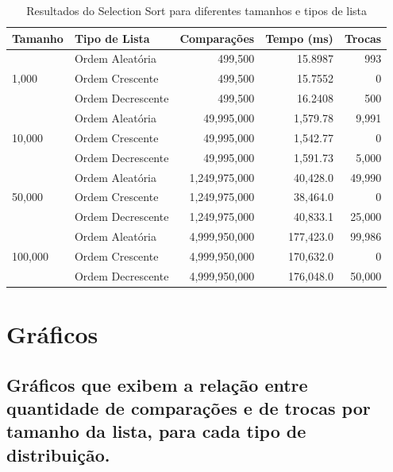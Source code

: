 \documentclass[tcc1,project]{uftex}
\begin{document}
\begin{table}[h]
\centering
\caption{Resultados do Selection Sort para diferentes tamanhos e tipos de lista}
\begin{tabular}{llrrr}
\toprule
\textbf{Tamanho} & \textbf{Tipo de Lista} & \textbf{Comparações} & \textbf{Tempo (ms)} & \textbf{Trocas} \\
\midrule
\multirow{3}{*}{1,000}   & Ordem Aleatória   & 499,500  & 15.8987   & 993 \\
                         & Ordem Crescente   & 499,500  & 15.7552   & 0 \\
                         & Ordem Decrescente & 499,500  & 16.2408   & 500 \\
\midrule
\multirow{3}{*}{10,000}  & Ordem Aleatória   & 49,995,000  & 1,579.78   & 9,991 \\
                         & Ordem Crescente   & 49,995,000  & 1,542.77   & 0 \\
                         & Ordem Decrescente & 49,995,000  & 1,591.73   & 5,000 \\
\midrule
\multirow{3}{*}{50,000}  & Ordem Aleatória   & 1,249,975,000  & 40,428.0  & 49,990 \\
                         & Ordem Crescente   & 1,249,975,000  & 38,464.0  & 0 \\
                         & Ordem Decrescente & 1,249,975,000  & 40,833.1  & 25,000 \\
\midrule
\multirow{3}{*}{100,000} & Ordem Aleatória   & 4,999,950,000  & 177,423.0 & 99,986 \\
                         & Ordem Crescente   & 4,999,950,000  & 170,632.0 & 0 \\
                         & Ordem Decrescente & 4,999,950,000  & 176,048.0 & 50,000 \\
\bottomrule
\end{tabular}
\end{table}





\section{Gráficos}

\subsection{Gráficos que exibem a relação entre quantidade de comparações e de trocas por tamanho da lista, para cada tipo de distribuição.}
\end{document}
